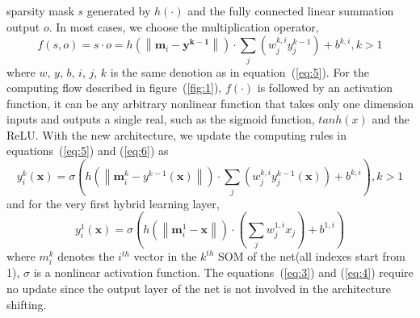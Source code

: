 \documentclass[3p,times,procedia]{elsarticle}
\begin{document}
sparsity mask $s$ generated by $h(\cdot)$ 
and the fully connected linear summation 
output $o$. In most cases, we choose the
multiplication operator,
\begin{equation}
	f(s,o) = s\cdot o = 
	h\left(
	\left\|
	\mathbf{m}_i-\mathbf{y^{k-1}}
	\right\|
	\right)
	\cdot
	\sum_j
	\left(
	w_j^{k,i}y_j^{k-1}
	\right)
	+b^{k,i},k>1
	\label{eq:14}
\end{equation}
where $w$, $y$, $b$, $i$, $j$, $k$ is the
same denotion as in equation~(\ref{eq:5}).
For the computing flow described in 
figure~(\ref{fig:1}), 
$f(\cdot) $ is followed 
by an activation function, it can be any 
arbitrary nonlinear function that takes 
only one dimension inputs and outputs a 
single real, such as the sigmoid function, 
$tanh(x)$ and the ReLU. With the new 
architecture, we update the computing rules 
in equations~(\ref{eq:5}) and (\ref{eq:6}) as 
\begin{equation}
	y_i^k(\mathbf{x})=
	\sigma\left(
	h\left(
	\left\|
	\mathbf{m}_i^k-y^{k-1}(\mathbf{x})
	\right\|
	\right)\cdot
	\sum_j\left(
	w_j^{k,i}y_j^{k-1}(\mathbf{x})
	\right) + b^{k,i}
	\right), k>1
	\label{eq:15}
\end{equation}
and for the very first hybrid learning layer,  
\begin{equation}
	y_i^1(\mathbf{x})=
	\sigma\left(
	h\left(
	\left\|
	\mathbf{m}_i^1-\mathbf{x}
	\right\|
	\right)\cdot
	\left(
	\sum_j w_j^{1,i}x_j
	\right) + b^{1,i}
	\right)
	\label{eq:16}
\end{equation}
where $m^k_i$ denotes the $i^{th}$ vector
in the $k^{th}$ SOM of the net(all indexes
start from 1), $\sigma$ is a nonlinear 
activation function.
The equations~(\ref{eq:3}) and (\ref{eq:4})
require no update since the output layer
of the net is not involved in the 
architecture shifting.
\end{document}
